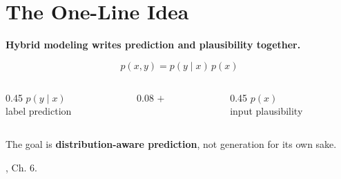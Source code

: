 \documentclass[fleqn,compress,utf8,aspectratio=169,t]{beamer}
\makeatletter
\newcommand{\mainclaim}[1]{%
  {\Large\bfseries #1\par}
}
\newcommand{\quietsource}[1]{%
  \vfill{\scriptsize\color{lmu@lightgray}#1\par}
}
\newcommand{\keyword}[1]{\textbf{\color{lmu@green}#1}}
\makeatother
\begin{document}

\section{The One-Line Idea}
\begin{frame}
  \vspace{0.1cm}
  \mainclaim{Hybrid modeling writes prediction and plausibility together.}

  \vspace{0.35cm}
  \begin{equation*}
    p(x,y)=p(y\mid x)\,p(x)
  \end{equation*}

  \vspace{0.35cm}
  \begin{columns}[T,totalwidth=\textwidth]
    \begin{column}{0.45\textwidth}
      \centering
      \keyword{\(p(y\mid x)\)}\\
      label prediction
    \end{column}
    \begin{column}{0.08\textwidth}
      \centering
      {\Large \(+\)}
    \end{column}
    \begin{column}{0.45\textwidth}
      \centering
      \keyword{\(p(x)\)}\\
      input plausibility
    \end{column}
  \end{columns}

  \vspace{0.35cm}
  \centering
  The goal is \keyword{distribution-aware prediction}, not generation for its own sake.

  \quietsource{\textcite{tomczak2024deep}, Ch. 6.}
\end{frame}

\end{document}
